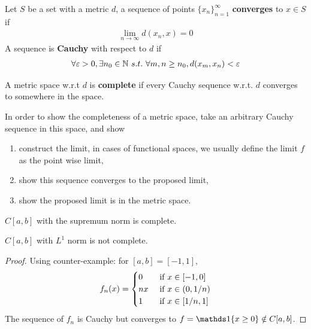 \documentclass[11pt]{article}
\begin{document}
	\begin{definition}
		Let $S$ be a set with a metric $d$, a sequence of points $\{x_n\}_{n=1}^\infty$ \textbf{converges} to $x \in S$ if
		\begin{align}
			\lim_{n \to \infty} d(x_n, x) = 0
		\end{align}
		A sequence is \textbf{Cauchy} with respect to $d$ if
		\begin{align}
			\forall \varepsilon > 0, \exists n_0 \in \N\ s.t.\ \forall m, n \geq n_0, d(x_m, x_n) < \varepsilon
		\end{align}
	\end{definition}
	
	\begin{definition}
		A metric space w.r.t $d$ is \textbf{complete} if every Cauchy sequence w.r.t. $d$ converges to somewhere in the space.
	\end{definition}

	\begin{remark}
		In order to show the completeness of a metric space, take an arbitrary Cauchy sequence in this space, and show
		\begin{enumerate}
			\item construct the limit, in cases of functional spaces, we usually define the limit $f$ as the point wise limit,
			\item show this sequence converges to the proposed limit,
			\item show the proposed limit is in the metric space.
		\end{enumerate}
	\end{remark}
	
	\begin{example}
		$C[a, b]$ with the supremum norm is complete.
	\end{example}
	
	\begin{example}
		$C[a, b]$ with $L^1$ norm is not complete.
		\begin{proof}
			Using counter-example: for $[a, b] = [-1, 1]$,
			\begin{align}
				f_n(x) = \begin{cases}
					0 &\text{{ if }} x \in [-1, 0] \\
					nx & \text{{ if }} x \in(0, 1/n) \\
					1 &\text{{ if }} x \in [1/n, 1] \\
				\end{cases}
			\end{align}
			The sequence of $f_n$ is Cauchy but converges to $f = \id{x \geq 0} \notin C[a,b]$.
		\end{proof}
	\end{example}
	
\end{document}
